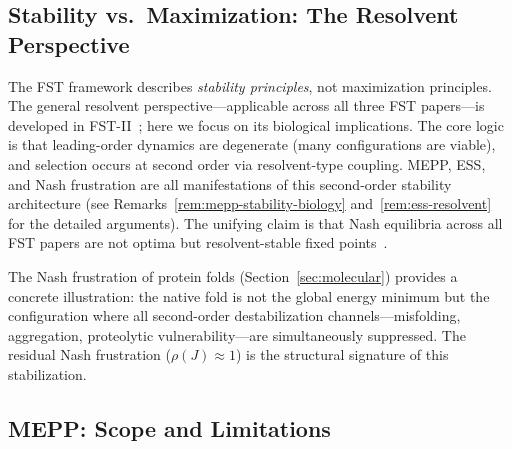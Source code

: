 \documentclass[12pt,a4paper]{article}
\theoremstyle{remark}
\begin{document}
\subsection{Stability vs.\ Maximization: The Resolvent Perspective}

The FST framework describes \emph{stability principles}, not maximization principles. The general resolvent perspective---applicable across all three FST papers---is developed in FST-II~\citep{FSTII}; here we focus on its biological implications. The core logic is that leading-order dynamics are degenerate (many configurations are viable), and selection occurs at second order via resolvent-type coupling. MEPP, ESS, and Nash frustration are all manifestations of this second-order stability architecture (see Remarks~\ref{rem:mepp-stability-biology} and~\ref{rem:ess-resolvent} for the detailed arguments). The unifying claim is that Nash equilibria across all FST papers are not optima but resolvent-stable fixed points~\citep{GeigerRH2026b}.

The Nash frustration of protein folds (Section~\ref{sec:molecular}) provides a concrete illustration: the native fold is not the global energy minimum but the configuration where all second-order destabilization channels---misfolding, aggregation, proteolytic vulnerability---are simultaneously suppressed. The residual Nash frustration ($\rho(J) \approx 1$) is the structural signature of this stabilization.

\subsection{MEPP: Scope and Limitations}
\end{document}
